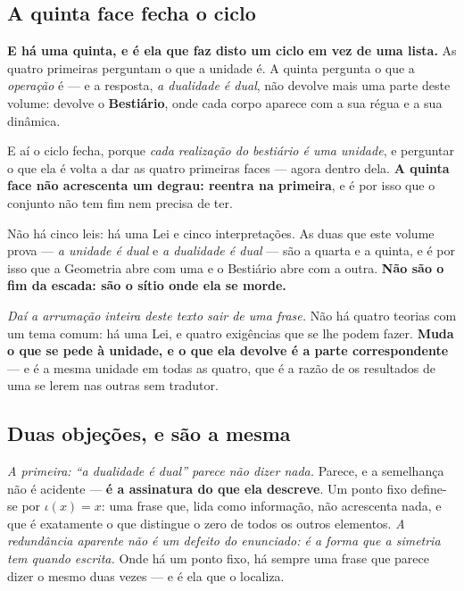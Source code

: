 \documentclass[livro.tex]{subfiles}
\begin{document}
\subsection{A quinta face fecha o ciclo}\label{sec:quintaface}

\noindent \textbf{E há uma quinta, e é ela que faz disto um ciclo em vez de uma lista.} As quatro
primeiras perguntam o que a unidade é. A quinta pergunta o que a \emph{operação} é --- e a resposta,
\emph{a dualidade é dual}, não devolve mais uma parte deste volume: devolve o \textbf{Bestiário},
onde cada corpo aparece com a sua régua e a sua dinâmica.

\medskip
\noindent E aí o ciclo fecha, porque \emph{cada realização do bestiário é uma unidade}, e perguntar
o que ela é volta a dar as quatro primeiras faces --- agora dentro dela. \textbf{A quinta face não
acrescenta um degrau: reentra na primeira}, e é por isso que o conjunto não tem fim nem precisa de
ter.

\medskip
\noindent Não há cinco leis: há uma Lei e cinco interpretações. As duas que este volume prova --- \emph{a unidade é dual} e \emph{a dualidade é
dual} --- são a quarta e a quinta, e é por isso que a Geometria abre com uma e o Bestiário abre com
a outra. \textbf{Não são o fim da escada: são o sítio onde ela se morde.}

\medskip
\noindent \emph{Daí a arrumação inteira deste texto sair de uma frase.} Não há quatro teorias com
um tema comum: há uma Lei, e quatro exigências que se lhe podem fazer. \textbf{Muda o que se pede à
unidade, e o que ela devolve é a parte correspondente} --- e é a mesma unidade em todas as quatro,
que é a razão de os resultados de uma se lerem nas outras sem tradutor.



\subsection{Duas objeções, e são a mesma}\label{sec:objecoes}

\noindent \emph{A primeira: ``a dualidade é dual'' parece não dizer nada.} Parece, e a semelhança
não é acidente --- \textbf{é a assinatura do que ela descreve}. Um ponto fixo define-se por
$\iota(x)=x$: uma frase que, lida como informação, não acrescenta nada, e que é exatamente o que
distingue o zero de todos os outros elementos. \emph{A redundância aparente não é um defeito do
enunciado: é a forma que a simetria tem quando escrita.} Onde há um ponto fixo, há sempre uma frase
que parece dizer o mesmo duas vezes --- e é ela que o localiza.
\end{document}
